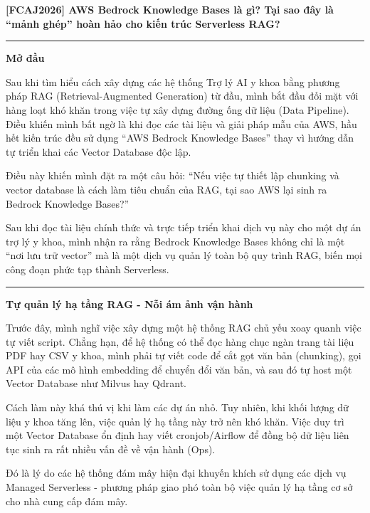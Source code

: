 \vspace{0.5em}\noindent\textbf{{[}FCAJ2026{]} AWS Bedrock Knowledge Bases là gì? Tại sao đây
là ``mảnh ghép'' hoàn hảo cho kiến trúc Serverless RAG?}

\begin{center}\rule{0.5\linewidth}{0.5pt}\end{center}

\vspace{0.5em}\noindent\textbf{Mở đầu}

Sau khi tìm hiểu cách xây dựng các hệ thống Trợ lý AI y khoa bằng phương
pháp RAG (Retrieval-Augmented Generation) từ đầu, mình bắt đầu đối mặt
với hàng loạt khó khăn trong việc tự xây dựng đường ống dữ liệu (Data
Pipeline). Điều khiến mình bất ngờ là khi đọc các tài liệu và giải pháp
mẫu của AWS, hầu hết kiến trúc đều sử dụng ``AWS Bedrock Knowledge
Bases'' thay vì hướng dẫn tự triển khai các Vector Database độc lập.

Điều này khiến mình đặt ra một câu hỏi: ``Nếu việc tự thiết lập chunking
và vector database là cách làm tiêu chuẩn của RAG, tại sao AWS lại sinh
ra Bedrock Knowledge Bases?''

Sau khi đọc tài liệu chính thức và trực tiếp triển khai dịch vụ này cho
một dự án trợ lý y khoa, mình nhận ra rằng Bedrock Knowledge Bases không
chỉ là một ``nơi lưu trữ vector'' mà là một dịch vụ quản lý toàn bộ quy
trình RAG, biến mọi công đoạn phức tạp thành Serverless.

\begin{center}\rule{0.5\linewidth}{0.5pt}\end{center}

\vspace{0.5em}\noindent\textbf{Tự quản lý hạ tầng RAG - Nỗi ám ảnh vận hành}

Trước đây, mình nghĩ việc xây dựng một hệ thống RAG chủ yếu xoay quanh
việc tự viết script. Chẳng hạn, để hệ thống có thể đọc hàng chục ngàn
trang tài liệu PDF hay CSV y khoa, mình phải tự viết code để cắt gọt văn
bản (chunking), gọi API của các mô hình embedding để chuyển đổi văn bản,
và sau đó tự host một Vector Database như Milvus hay Qdrant.

Cách làm này khá thú vị khi làm các dự án nhỏ. Tuy nhiên, khi khối lượng
dữ liệu y khoa tăng lên, việc quản lý hạ tầng này trở nên khó khăn. Việc
duy trì một Vector Database ổn định hay viết cronjob/Airflow để đồng bộ
dữ liệu liên tục sinh ra rất nhiều vấn đề về vận hành (Ops).

Đó là lý do các hệ thống đám mây hiện đại khuyến khích sử dụng các dịch
vụ Managed Serverless - phương pháp giao phó toàn bộ việc quản lý hạ
tầng cơ sở cho nhà cung cấp đám mây.

